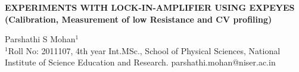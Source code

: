 \documentclass{article}
\begin{document}
  



\newpage

\begin{center}
    \large{\textbf{EXPERIMENTS WITH LOCK-IN-AMPLIFIER USING EXPEYES
(Calibration, Measurement of low Resistance and CV profiling)}}

    \vspace{0.5 cm}
    \large{Parshathi S Mohan$^1$}
\\
    \normalsize{$^1$Roll No: 2011107, 4th year Int.MSc., School of Physical Sciences, National Institute of Science Education and Research. parshathi.mohan@niser.ac.in}
\end{center}

\end{document}
